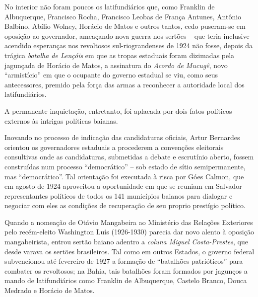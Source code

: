 No interior não foram poucos os latifundiários que, como Franklin de Albuquerque, Francisco Rocha, Francisco Leobas de França Antunes, Antônio Balbino, Abílio Wolney, Horácio de Matos e outros tantos, cedo puseram-se em oposição ao governador, ameaçando nova guerra nos sertões -- que teria inclusive acendido esperanças nos revoltosos sul-riograndenses de 1924 não fosse, depois da trágica \textit{batalha de Lençóis} em que as tropas estaduais foram dizimadas pela jagunçada de Horácio de Matos, a assinatura do \textit{Acordo de Mucugê}, novo ``armistício'' em que o ocupante do governo estadual se viu, como seus antecessores, premido pela força das armas a reconhecer a autoridade local dos latifundiários.

A permanente inquietação, entretanto, foi aplacada por dois fatos políticos externos às intrigas políticas baianas. 

Inovando no processo de indicação das candidaturas oficiais, Artur Bernardes orientou os governadores estaduais a procederem a convenções eleitorais consultivas onde as candidaturas, submetidas a debate e escrutínio aberto, fossem construídas num processo ``democrático'' -- sob estado de sítio semipermanente, mas ``democrático''. Tal orientação foi executada à risca por Góes Calmon, que em agosto de 1924 aproveitou a oportunidade em que se reuniam em Salvador representantes políticos de todos os 141 municípios baianos para dialogar e negociar com eles as condições de recuperação de seu proprio prestígio político. 

Quando a nomeação de Otávio Mangabeira ao Ministério das Relações Exteriores pelo recém-eleito Washington Luís (1926-1930) parecia dar novo alento à oposição mangabeirista, entrou sertão baiano adentro a \textit{coluna Miguel Costa-Prestes}, que desde varava os sertões brasileiros. Tal como em outros Estados, o governo federal subvencionou até fevereiro de 1927 a formação de ``batalhões patrióticos'' para combater os revoltosos; na Bahia, tais batalhões foram formados por jagunços a mando de latifundiários como Franklin de Albuquerque, Castelo Branco, Douca Medrado e Horácio de Matos. 

